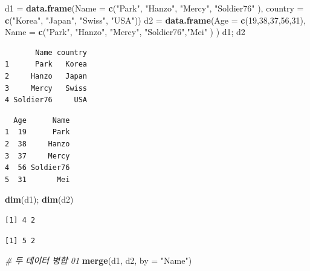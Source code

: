\documentclass[
  11pt,
]{krantz}
\newenvironment{Shaded}{\begin{snugshade}}{\end{snugshade}}
\newcommand{\CommentTok}[1]{\textcolor[rgb]{0.37,0.37,0.37}{\textit{#1}}}
\newcommand{\DataTypeTok}[1]{\textcolor[rgb]{0.27,0.27,0.27}{#1}}
\newcommand{\DecValTok}[1]{\textcolor[rgb]{0.06,0.06,0.06}{#1}}
\newcommand{\KeywordTok}[1]{\textcolor[rgb]{0.27,0.27,0.27}{\textbf{#1}}}
\newcommand{\NormalTok}[1]{#1}
\newcommand{\StringTok}[1]{\textcolor[rgb]{0.5,0.5,0.5}{#1}}
\begin{document}
\begin{Shaded}
\begin{Highlighting}[]
\NormalTok{d1 =}\StringTok{ }\KeywordTok{data.frame}\NormalTok{(}\DataTypeTok{Name =} \KeywordTok{c}\NormalTok{(}\StringTok{"Park"}\NormalTok{, }\StringTok{"Hanzo"}\NormalTok{, }\StringTok{"Mercy"}\NormalTok{, }\StringTok{"Soldier76"}\NormalTok{ ),}
                \DataTypeTok{country =} \KeywordTok{c}\NormalTok{(}\StringTok{"Korea"}\NormalTok{, }\StringTok{"Japan"}\NormalTok{, }\StringTok{"Swiss"}\NormalTok{, }\StringTok{"USA"}\NormalTok{))}
\NormalTok{d2 =}\StringTok{ }\KeywordTok{data.frame}\NormalTok{(}\DataTypeTok{Age =} \KeywordTok{c}\NormalTok{(}\DecValTok{19}\NormalTok{,}\DecValTok{38}\NormalTok{,}\DecValTok{37}\NormalTok{,}\DecValTok{56}\NormalTok{,}\DecValTok{31}\NormalTok{),}
                \DataTypeTok{Name =} \KeywordTok{c}\NormalTok{(}\StringTok{"Park"}\NormalTok{, }\StringTok{"Hanzo"}\NormalTok{, }\StringTok{"Mercy"}\NormalTok{, }\StringTok{"Soldier76"}\NormalTok{,}\StringTok{"Mei"}\NormalTok{ ) )}
\NormalTok{d1; d2}
\end{Highlighting}
\end{Shaded}

\begin{verbatim}
       Name country
1      Park   Korea
2     Hanzo   Japan
3     Mercy   Swiss
4 Soldier76     USA
\end{verbatim}

\begin{verbatim}
  Age      Name
1  19      Park
2  38     Hanzo
3  37     Mercy
4  56 Soldier76
5  31       Mei
\end{verbatim}

\begin{Shaded}
\begin{Highlighting}[]
\KeywordTok{dim}\NormalTok{(d1); }\KeywordTok{dim}\NormalTok{(d2)}
\end{Highlighting}
\end{Shaded}

\begin{verbatim}
[1] 4 2
\end{verbatim}

\begin{verbatim}
[1] 5 2
\end{verbatim}

\begin{Shaded}
\begin{Highlighting}[]
\CommentTok{# 두 데이터 병합 01}
\KeywordTok{merge}\NormalTok{(d1, d2, }\DataTypeTok{by =} \StringTok{"Name"}\NormalTok{)}
\end{Highlighting}
\end{Shaded}
\end{document}
